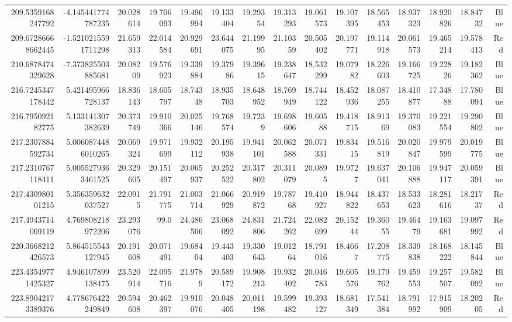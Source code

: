 \begin{center}
\begin{longtable}{rrrrrrrrrrrrrrr}
209.5359168247792 & -4.145441774787235 & 20.028614 & 19.706093 & 19.496994 & 19.133404 & 19.29354 & 19.313293 & 19.061573 & 19.107395 & 18.565453 & 18.937323 & 18.920826 & 18.84732 & Blue \\
209.67286668662445 & -1.5210215591711298 & 21.659313 & 22.014584 & 20.929691 & 23.644075 & 21.19995 & 21.10359 & 20.505402 & 20.197771 & 19.114918 & 20.061573 & 19.465214 & 19.578413 & Red \\
210.6878474329628 & -7.373825503885681 & 20.08209 & 19.576923 & 19.339884 & 19.37986 & 19.39615 & 19.238647 & 18.532299 & 19.07982 & 18.226603 & 19.166725 & 19.22826 & 19.182362 & Blue \\
216.7245347178442 & 5.421495966728137 & 18.836143 & 18.605797 & 18.74348 & 18.935703 & 18.648952 & 18.769949 & 18.744122 & 18.452936 & 18.087255 & 18.410877 & 17.34888 & 17.780094 & Blue \\
216.795092182775 & 5.133141307382639 & 20.373749 & 19.910366 & 20.025146 & 19.768574 & 19.7239 & 19.698606 & 19.60588 & 19.418715 & 18.91369 & 19.370083 & 19.221554 & 19.290802 & Blue \\
217.2307884592734 & 5.0060874486010265 & 20.069324 & 19.971699 & 19.932112 & 20.195938 & 19.941101 & 20.062588 & 20.071331 & 19.83415 & 19.516819 & 20.020847 & 19.979599 & 20.019775 & Blue \\
217.2310767118411 & 5.0055279363461525 & 20.329605 & 20.151497 & 20.065937 & 20.252522 & 20.317802 & 20.311079 & 20.0895 & 19.9727 & 19.637041 & 20.106888 & 19.947117 & 20.059391 & Blue \\
217.430980101215 & 5.356359632037527 & 22.0915 & 21.791775 & 21.003714 & 21.066929 & 20.919872 & 19.78768 & 19.410927 & 18.944822 & 18.437653 & 18.533623 & 18.281616 & 18.21737 & Red \\
217.4943714069119 & 4.769808218972206 & 23.293076 & 99.0 & 24.486506 & 23.068092 & 24.831806 & 21.724262 & 22.082699 & 20.15244 & 19.36055 & 19.46479 & 19.163681 & 19.097992 & Red \\
220.3668212426573 & 5.864515543127945 & 20.191608 & 20.071491 & 19.68404 & 19.443403 & 19.330643 & 19.01264 & 18.791016 & 18.4667 & 17.208775 & 18.339838 & 18.168222 & 18.145844 & Blue \\
223.43549771425327 & 4.946107899138475 & 23.520914 & 22.095716 & 21.9789 & 20.589172 & 19.908213 & 19.932402 & 20.046783 & 19.605576 & 19.179762 & 19.459553 & 19.257507 & 19.582092 & Blue \\
223.89042173389376 & 4.778676422249849 & 20.594608 & 20.462397 & 19.910076 & 20.048405 & 20.011198 & 19.599482 & 19.393127 & 18.681349 & 17.541384 & 18.791992 & 17.915909 & 18.20205 & Red \\

\end{longtable}
\end{center}

